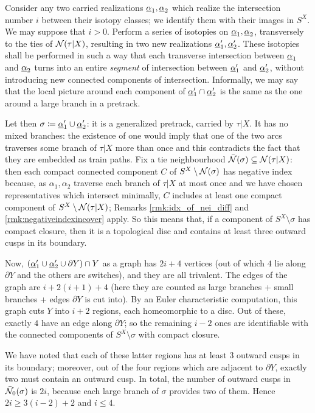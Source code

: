 \begin{rmk}
\begin{enumerate}
Consider any two carried realizations $\underline{\alpha}_1,\underline{\alpha}_2$ which realize the intersection number $i$ between their isotopy classes; we identify them with their images in $S^X$. We may suppose that $i>0$. Perform a series of isotopies on $\underline{\alpha}_1,\underline{\alpha}_2$, transversely to the ties of ${\mathcal N}(\tau|X)$, resulting in two new realizations $\underline{\alpha}'_1,\underline{\alpha}'_2$. These isotopies shall be performed in such a way that each transverse intersection between $\underline{\alpha}_1$ and $\underline{\alpha}_2$ turns into an entire \emph{segment} of intersection between $\underline{\alpha}'_1$ and $\underline{\alpha}'_2$, without introducing new connected components of intersection. Informally, we may say that the local picture around each component of $\underline{\alpha}'_1\cap\underline{\alpha}'_2$ is the same as the one around a large branch in a pretrack.

Let then $\sigma\coloneqq \underline{\alpha}'_1\cup\underline{\alpha}'_2$: it is a generalized pretrack, carried by $\tau|X$. It has no mixed branches: the existence of one would imply that one of the two arcs traverses some branch of $\tau|X$ more than once and this contradicts the fact that they are embedded as train paths. Fix a tie neighbourhood $\bar{{\mathcal N}}(\sigma)\subseteq {\mathcal N}(\tau|X)$: then each compact connected component $C$ of $S^X\setminus {\mathcal N}(\sigma)$ has negative index because, as $\alpha_1,\alpha_2$ traverse each branch of $\tau|X$ at most once and we have chosen representatives which intersect minimally, $C$ includes at least one compact component of $S^X\setminus{\mathcal N}(\tau|X)$; Remarks \ref{rmk:idx_of_nei_diff} and \ref{rmk:negativeindexincover} apply. So this means that, if a component of $S^X\setminus \sigma$ has compact closure, then it is a topological disc and contains at least three outward cusps in its boundary.

Now, $(\underline{\alpha}'_1\cup\underline{\alpha}'_2\cup \partial Y)\cap Y$ as a graph has $2i+4$ vertices (out of which $4$ lie along $\partial Y$ and the others are switches), and they are all trivalent. The edges of the graph are $i+2(i+1)+4$ (here they are counted as large branches + small branches + edges $\partial Y$ is cut into). By an Euler characteristic computation, this graph cuts $Y$ into $i+2$ regions, each homeomorphic to a disc. Out of these, exactly $4$ have an edge along $\partial Y$; so the remaining $i-2$ ones are identifiable with the connected components of $S^X\setminus\sigma$ with compact closure.

We have noted that each of these latter regions has at least $3$ outward cusps in its boundary; moreover, out of the four regions which are adjacent to $\partial Y$, exactly two must contain an outward cusp. In total, the number of outward cusps in $\bar{{\mathcal N}}_0(\sigma)$ is $2i$, because each large branch of $\sigma$ provides two of them. Hence $2i\geq 3(i-2)+2$ and $i\leq 4$.
\end{enumerate}
\end{rmk}

